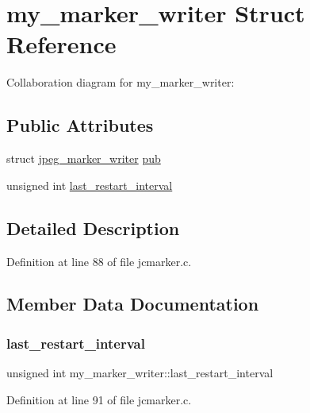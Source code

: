 \hypertarget{structmy__marker__writer}{}\section{my\+\_\+marker\+\_\+writer Struct Reference}
\label{structmy__marker__writer}


Collaboration diagram for my\+\_\+marker\+\_\+writer\+:
\subsection*{Public Attributes}
\begin{DoxyCompactItemize}
\item 
struct \mbox{\hyperlink{structjpeg__marker__writer}{jpeg\+\_\+marker\+\_\+writer}} \mbox{\hyperlink{structmy__marker__writer_a4b02f71e32586520f4498e51a79b1fca}{pub}}
\item 
unsigned int \mbox{\hyperlink{structmy__marker__writer_a772bc536da8c387a460a529c3d8145e4}{last\+\_\+restart\+\_\+interval}}
\end{DoxyCompactItemize}


\subsection{Detailed Description}


Definition at line 88 of file jcmarker.\+c.



\subsection{Member Data Documentation}
\mbox{\label{structmy__marker__writer_a772bc536da8c387a460a529c3d8145e4}} 
\subsubsection{\texorpdfstring{last\_restart\_interval}{last\_restart\_interval}}
{\footnotesize\ttfamily unsigned int my\+\_\+marker\+\_\+writer\+::last\+\_\+restart\+\_\+interval}



Definition at line 91 of file jcmarker.\+c.


